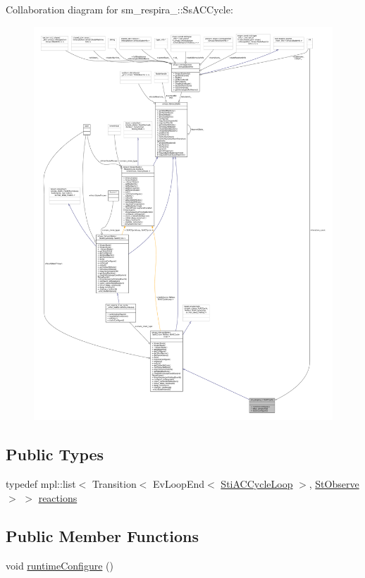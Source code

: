 Collaboration diagram for sm\+\_\+respira\+\_\+:\+:Ss\+A\+C\+Cycle\+:
\nopagebreak
\begin{figure}[H]
\begin{center}
\leavevmode
\includegraphics[width=350pt]{structsm__respira__1_1_1SsACCycle__coll__graph}
\end{center}
\end{figure}
\subsection*{Public Types}
\begin{DoxyCompactItemize}
\item 
typedef mpl\+::list$<$ Transition$<$ Ev\+Loop\+End$<$ \hyperlink{structsm__respira__1_1_1ac__cycle__inner__states_1_1StiACCycleLoop}{Sti\+A\+C\+Cycle\+Loop} $>$, \hyperlink{structsm__respira__1_1_1StObserve}{St\+Observe} $>$ $>$ \hyperlink{structsm__respira__1_1_1SsACCycle_a4cdcfe6c1f129ede9cfb53e76b376e4f}{reactions}
\end{DoxyCompactItemize}
\subsection*{Public Member Functions}
\begin{DoxyCompactItemize}
\item 
void \hyperlink{structsm__respira__1_1_1SsACCycle_ad81f188ee81b7909825a1d69a4ee0809}{runtime\+Configure} ()
\end{DoxyCompactItemize}
